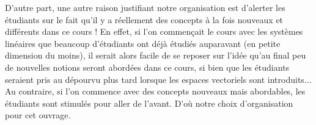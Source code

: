 D'autre part, une autre raison justifiant notre organisation est d'alerter les étudiants sur le fait qu'il y a réellement des concepts à la fois nouveaux et différents dans ce cours ! En effet, si l'on commençait le cours avec les systèmes linéaires que beaucoup d'étudiants ont déjà étudiés auparavant (en petite dimension du moins), il serait alors facile de se reposer sur l'idée qu'au final peu de nouvelles notions seront abordées dans ce cours, si bien que les étudiants seraient pris au dépourvu plus tard lorsque les espaces vectoriels sont introduits... Au contraire, si l'on commence avec des concepts nouveaux mais abordables, les étudiants sont stimulés pour aller de l'avant. D'où notre choix d'organisation pour cet ouvrage.






